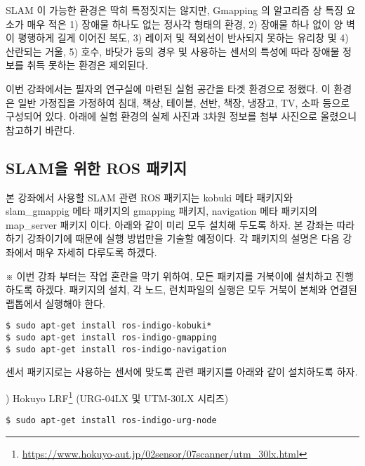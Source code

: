 SLAM 이 가능한 환경은 딱히 특정짓지는 않지만, Gmapping 의 알고리즘 상 특징 요소가 매우 적은 1) 장애물 하나도 없는 정사각 형태의 환경, 2) 장애물 하나 없이 양 벽이 평행하게 길게 이어진 복도, 3) 레이저 및 적외선이 반사되지 못하는 유리창 및 4) 산란되는 거울, 5) 호수, 바닷가 등의 경우 및 사용하는 센서의 특성에 따라 장애물 정보를 취득 못하는 환경은 제외된다.

이번 강좌에서는 필자의 연구실에 마련된 실험 공간을 타겟 환경으로 정했다. 이 환경은 일반 가정집을 가정하여 침대, 책상, 테이블, 선반, 책장, 냉장고, TV, 소파 등으로 구성되어 있다. 아래에 실험 환경의 실제 사진과 3차원 정보를 첨부 사진으로 올렸으니 참고하기 바란다. 

\subsection{SLAM을 위한 ROS 패키지}

본 강좌에서 사용할 SLAM 관련 ROS 패키지는 kobuki 메타 패키지와 slam\_gmappig 메타 패키지의 gmapping 패키지, navigation 메타 패키지의 map\_server 패키지 이다. 아래와 같이 미리 모두 설치해 두도록 하자. 본 강좌는 따라하기 강좌이기에 때문에 실행 방법만을 기술할 예정이다. 각 패키지의 설명은 다음 강좌에서 매우 자세히 다루도록 하겠다. 

※ 이번 강좌 부터는 작업 혼란을 막기 위하여, 모든 패키지를 거북이에 설치하고 진행하도록 하겠다. 패키지의 설치, 각 노드, 런치파일의 실행은 모두 거북이 본체와 연결된 랩톱에서 실행해야 한다.

\vspace{\baselineskip}
\begin{lstlisting}[language=ROS]
$ sudo apt-get install ros-indigo-kobuki*
$ sudo apt-get install ros-indigo-gmapping
$ sudo apt-get install ros-indigo-navigation
\end{lstlisting}

센서 패키지로는 사용하는 센서에 맞도록 관련 패키지를 아래와 같이 설치하도록 하자.

\setcounter{num}{0}

\vspace{\baselineskip}
\noindent
{}
\thenum) Hokuyo LRF\footnote{\url{https://www.hokuyo-aut.jp/02sensor/07scanner/utm_30lx.html}} (URG-04LX 및 UTM-30LX 시리즈)

\vspace{\baselineskip}
\begin{lstlisting}[language=ROS]
$ sudo apt-get install ros-indigo-urg-node
\end{lstlisting}
 
